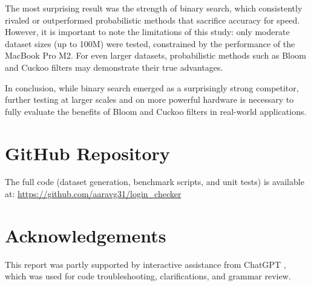 \documentclass[acmsmall]{acmart}
\begin{document}
The most surprising result was the strength of binary search, which consistently rivaled or outperformed probabilistic methods that sacrifice accuracy for speed. However, it is important to note the limitations of this study: only moderate dataset sizes (up to 100M) were tested, constrained by the performance of the MacBook Pro M2. For even larger datasets, probabilistic methods such as Bloom and Cuckoo filters may demonstrate their true advantages.  

In conclusion, while binary search emerged as a surprisingly strong competitor, further testing at larger scales and on more powerful hardware is necessary to fully evaluate the benefits of Bloom and Cuckoo filters in real-world applications.

\section*{GitHub Repository}
The full code (dataset generation, benchmark scripts, and unit tests) is available at:  
\url{https://github.com/aaravg31/login_checker}

\section*{Acknowledgements}
This report was partly supported by interactive assistance from ChatGPT \cite{chatgpt}, which was used for code troubleshooting, clarifications, and grammar review.



\end{document}

